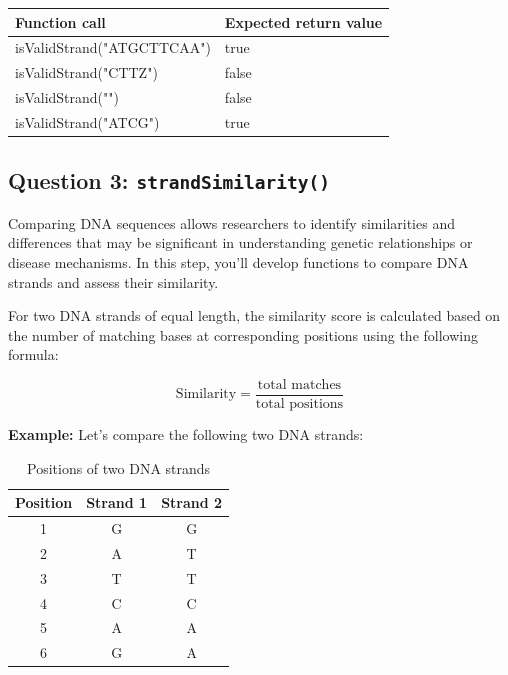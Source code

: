 \begin{sampleProject}
    \hspace{0pt}
    \begin{longtable}{|p{2.0in}|p{2.0in}|}
        \hline
        \textbf{Function call}
            & 
            \textbf{Expected return value}
            \\ \hline
        
        isValidStrand("ATGCTTCAA")
            & 
            true
            \\ \hline
        
        isValidStrand("CTTZ")
            & 
            false
            \\ \hline
        
        isValidStrand("")
            & 
            false
            \\ \hline

        isValidStrand("ATCG")
            & 
            true
            \\ \hline
    \end{longtable}
\end{sampleProject}


\subsection{Question 3: \texttt{strandSimilarity()}}

Comparing DNA sequences allows researchers to identify similarities and differences that may be significant in understanding genetic relationships or disease mechanisms. In this step, you'll develop functions to compare DNA strands and assess their similarity.

For two DNA strands of equal length, the similarity score is calculated based on the number of matching bases at corresponding positions using the following formula:

\[
\text{Similarity} = \frac{\text{total matches}}{\text{total positions}}
\]

\textbf{Example:}
Let's compare the following two DNA strands:

\begin{table}[htbp]
    \centering
    \begin{tabular}{|c|c|c|}
    \hline
    \textbf{Position} & \textbf{Strand 1} & \textbf{Strand 2} \\
    \hline
    1 & G & G \\
    2 & A & T \\
    3 & T & T \\
    4 & C & C \\
    5 & A & A \\
    6 & G & A \\
    \hline
    \end{tabular}
    \caption{Positions of two DNA strands}
\end{table}

